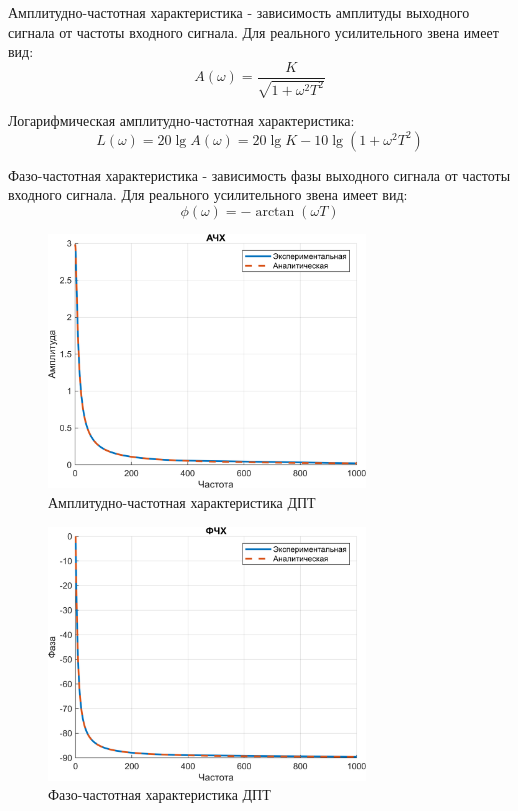Амплитудно-частотная характеристика - зависимость амплитуды выходного сигнала от частоты входного сигнала.
Для реального усилительного звена имеет вид:
\[
A(\omega) = \frac{K}{\sqrt{1 + \omega^2 T^2}}
\]

Логарифмическая амплитудно-частотная характеристика:
\[
L(\omega) = 20 \lg A(\omega) = 20 \lg K - 10 \lg (1 + \omega^2 T^2)
\]

Фазо-частотная характеристика - зависимость фазы выходного сигнала от частоты входного сигнала.
Для реального усилительного звена имеет вид:
\[
\phi(\omega) = -\arctan(\omega T)
\]

\begin{figure}[H]
    \centering
    \includegraphics[width=0.75\textwidth, trim={0cm 0cm 0cm 0cm}]{../images/1_3.png}
    \caption{Амплитудно-частотная характеристика ДПТ}
\end{figure}

\begin{figure}[H]
    \centering
    \includegraphics[width=0.75\textwidth, trim={0cm 0cm 0cm 0cm}]{../images/1_4.png}
    \caption{Фазо-частотная характеристика ДПТ}
\end{figure}

